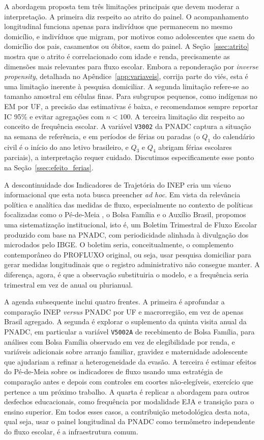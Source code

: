 A abordagem proposta tem três limitações principais que devem
moderar a interpretação. A primeira diz respeito ao atrito do
painel. O acompanhamento longitudinal funciona apenas para
indivíduos que permanecem no mesmo domicílio, e indivíduos que
migram, por motivos como adolescentes que saem do domicílio dos
pais, casamentos ou óbitos, saem do painel. A
Seção~\ref{ssec:atrito} mostra que o atrito é correlacionado com
idade e renda, precisamente as dimensões mais relevantes para fluxo
escolar. Embora a reponderação por \emph{inverse propensity},
detalhada no Apêndice~\ref{app:variaveis}, corrija parte do viés,
esta é uma limitação inerente à pesquisa domiciliar. A segunda
limitação refere-se ao tamanho amostral em células finas. Para
subgrupos pequenos, como indígenas no EM por UF, a precisão das
estimativas é baixa, e recomendamos sempre reportar IC 95\% e
evitar agregações com $n < 100$. A terceira limitação diz respeito
ao conceito de frequência escolar. A variável \texttt{V3002} da
PNADC captura a situação na semana de referência, e em períodos de
férias ou paradas (o $Q_1$ do calendário civil é o início do ano
letivo brasileiro, e $Q_3$ e $Q_4$ abrigam férias escolares
parciais), a interpretação requer cuidado. Discutimos
especificamente esse ponto na Seção~\ref{ssec:efeito_ferias}.

A descontinuidade dos Indicadores de Trajetória do INEP cria um
vácuo informacional que esta nota busca preencher \emph{ad hoc}.
Em vista da relevância política e analítica das medidas de fluxo,
especialmente no contexto de políticas focalizadas como o
Pé-de-Meia \citep{Brasil2024_PeDeMeia}, o Bolsa Família e o
Auxílio Brasil, propomos uma sistematização institucional, isto é,
um Boletim Trimestral de Fluxo Escolar produzido com base na
PNADC, com periodicidade alinhada à divulgação dos microdados pelo
IBGE. O boletim seria, conceitualmente, o complemento contemporâneo
do PROFLUXO original, ou seja, usar pesquisa domiciliar para gerar
medidas longitudinais que o registro administrativo não consegue
manter. A diferença, agora, é que a observação substituiria o
modelo, e a frequência seria trimestral em vez de anual ou
plurianual.

A agenda subsequente inclui quatro frentes. A primeira é
aprofundar a comparação INEP \emph{versus} PNADC por UF e
macrorregião, em vez de apenas Brasil agregado. A segunda é
explorar o suplemento da quinta visita anual da PNADC, em
particular a variável \texttt{V5002A} de recebimento de Bolsa
Família, para análises com Bolsa Família observado em vez de
elegibilidade por renda, e variáveis adicionais sobre arranjo
familiar, gravidez e maternidade adolescente que ajudariam a
refinar a heterogeneidade da evasão. A terceira é estimar
efeitos do Pé-de-Meia sobre os indicadores de fluxo usando uma
estratégia de comparação antes e depois com controles em
coortes não-elegíveis, exercício que pertence a um próximo
trabalho. A quarta é replicar a abordagem para outros desfechos
educacionais, como frequência por modalidade EJA e transição
para o ensino superior. Em todos esses casos, a contribuição
metodológica desta nota, qual seja, usar o painel longitudinal
da PNADC como termômetro independente do fluxo escolar, é a
infraestrutura comum.
